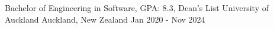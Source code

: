 
\begin{cventries}
  \cventry
    {Bachelor of Engineering in Software, GPA: 8.3, Dean's List} %
    {University of Auckland} %
    {Auckland, New Zealand} %
    {Jan 2020 - Nov 2024} %
    \item{}
    \vspace{-15mm}

\end{cventries}
